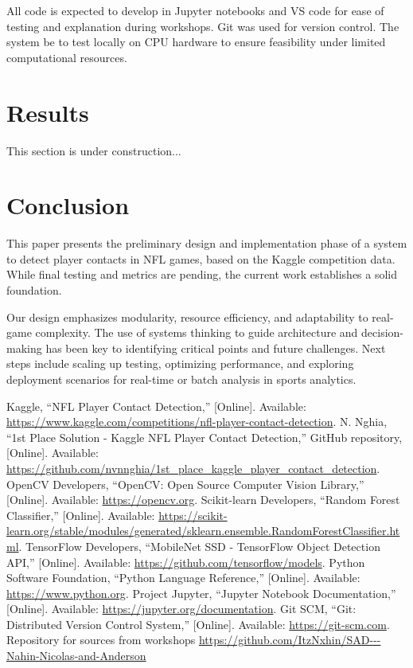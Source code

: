 \documentclass[conference]{IEEEtran}
\begin{document}
	All code is expected to develop in Jupyter notebooks and VS code for ease of testing and explanation during workshops. Git was used for version control. The system be to test locally on CPU hardware to ensure feasibility under limited computational resources.
	
	\newpage
	\section*{Results}
	
	This section is under construction...
	
	\section*{Conclusion}
	
	This paper presents the preliminary design and implementation phase of a system to detect player contacts in NFL games, based on the Kaggle competition data. While final testing and metrics are pending, the current work establishes a solid foundation.
	
	Our design emphasizes modularity, resource efficiency, and adaptability to real-game complexity. The use of systems thinking to guide architecture and decision-making has been key to identifying critical points and future challenges. Next steps include scaling up testing, optimizing performance, and exploring deployment scenarios for real-time or batch analysis in sports analytics.
	
	\begin{thebibliography}{00}
		 Kaggle, “NFL Player Contact Detection,” [Online]. Available: \url{https://www.kaggle.com/competitions/nfl-player-contact-detection}.
		 N. Nghia, “1st Place Solution - Kaggle NFL Player Contact Detection,” GitHub repository, [Online]. Available: \url{https://github.com/nvnnghia/1st_place_kaggle_player_contact_detection}.
		 OpenCV Developers, “OpenCV: Open Source Computer Vision Library,” [Online]. Available: \url{https://opencv.org}.
		 Scikit-learn Developers, “Random Forest Classifier,” [Online]. Available: \url{https://scikit-learn.org/stable/modules/generated/sklearn.ensemble.RandomForestClassifier.html}.
		 TensorFlow Developers, “MobileNet SSD - TensorFlow Object Detection API,” [Online]. Available: \url{https://github.com/tensorflow/models}.
		 Python Software Foundation, “Python Language Reference,” [Online]. Available: \url{https://www.python.org}.
		 Project Jupyter, “Jupyter Notebook Documentation,” [Online]. Available: \url{https://jupyter.org/documentation}.
		 Git SCM, “Git: Distributed Version Control System,” [Online]. Available: \url{https://git-scm.com}.
		 Repository for sources from workshops \url{https://github.com/ItzNxhin/SAD---Nahin-Nicolas-and-Anderson}
	\end{thebibliography}
	
	
\end{document}
